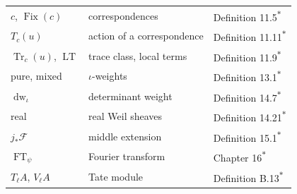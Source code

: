 \documentclass[11pt]{article}
\newcommand{\bpout}[1]{#1\textsuperscript{\hyperlink{bp-outside}{\ensuremath{\ast}}}}
\providecommand{\Fix}{}\renewcommand{\Fix}{\operatorname{Fix}}
\begin{document}
\begin{center}
\begin{tabularx}{\linewidth}{>{\raggedright\arraybackslash}X>{\raggedright\arraybackslash}X>{\raggedright\arraybackslash}X}
\(c\), \(\Fix(c)\) & correspondences & \bpout{Definition 11.5} \\
\(T_c(u)\) & action of a correspondence & \bpout{Definition 11.11} \\
\(\operatorname{Tr}_c(u)\), \(\operatorname{LT}\) & trace class, local terms & \bpout{Definition 11.9} \\
pure, mixed & \(\iota\)-weights & \bpout{Definition 13.1} \\
\(\operatorname{dw}_\iota\) & determinant weight & \bpout{Definition 14.7} \\
real & real Weil sheaves & \bpout{Definition 14.21} \\
\(j_*\mathcal F\) & middle extension & \bpout{Definition 15.1} \\
\(\operatorname{FT}_\psi\) & Fourier transform & Chapter \bpout{16} \\
\(T_\ell A\), \(V_\ell A\) & Tate module & \bpout{Definition B.13} \\
\bottomrule
\end{tabularx}
\end{center}



\clearpage{}\hypertarget{bp-outside}{}%
\end{document}
